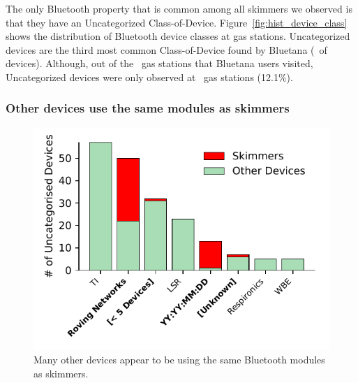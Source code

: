 The only Bluetooth property that is common among all skimmers we observed is
that they have an Uncategorized Class-of-Device.
%
Figure~\ref{fig:hist_device_class} shows the distribution of Bluetooth device classes at gas stations.
%
Uncategorized devices are the third most common Class-of-Device found by Bluetana (\percentbtuncategorized~of devices).
%
Although, out of the \visitedgasstations~gas stations that Bluetana users visited, Uncategorized devices were only observed at \totaluncatstation~gas stations (12.1\%).

\subsubsection*{Other devices use the same modules as skimmers} %


\begin{figure}
\centering
\includegraphics[width=\linewidth]{skimmer/plots/uncat_hist_device_OUI.pdf}
\caption{
\label{fig:hist_device_OUI}
Many other devices appear to be using the same Bluetooth modules as skimmers.
}
\end{figure}

